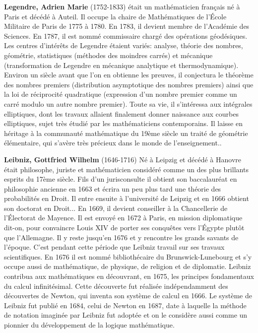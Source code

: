 \textbf{Legendre, Adrien Marie} (1752-1833) était un mathématicien français né à Paris et décédé à Auteil. Il occupe la chaire de Mathématiques de l'École Militaire de Paris de 1775 à 1780. En 1783, il devient membre de l'Académie des Sciences. En 1787, il est nommé commissaire chargé des opérations géodésiques. Les centres d'intérêts de Legendre étaient variés: analyse, théorie des nombres, géométrie, statistiques (méthodes des moindres carrés) et mécanique (transformation de Legendre en mécanique analytique et thermodynamique). Environ un siècle avant que l'on en obtienne les preuves, il conjectura le théorème des nombres premiers (distribution asymptotique des nombres premiers) ainsi que la loi de réciprocité quadratique (expression d'un nombre premier comme un carré modulo un autre nombre premier). Toute sa vie, il s'intéressa aux intégrales elliptiques, dont les travaux allaient finalement donner naissance aux courbes elliptiques, sujet très étudié par les mathématiciens contemporains. Il laisse en héritage à la communauté mathématique du 19ème siècle un traité de géométrie élémentaire, qui s'avère très précieux dans le monde de l'enseignement..

\textbf{Leibniz, Gottfried Wilhelm} (1646-1716) Né à Leipzig et décédé à Hanovre était philosophe, juriste et mathématicien considéré comme un des plus brillants esprits du 17ème siècle. Fils d'un jurisconsulte il obtient son baccalauréat en philosophie ancienne en 1663 et écrira un peu plus tard une théorie des probabilités en Droit. Il entre ensuite à l'université de Leipzig et en 1666 obtient son doctorat en Droit... En 1669, il devient conseiller à la Chancellerie de l'Électorat de Mayence. Il est envoyé en 1672 à Paris, en mission diplomatique dit-on, pour convaincre Louis XIV de porter ses conquêtes vers l'Égypte plutôt que l'Allemagne. Il y reste jusqu'en 1676 et y rencontre les grands savants de l'époque. C'est pendant cette période que Leibniz travail sur ses travaux scientifiques. En 1676 il est nommé bibliothécaire du Brunswick-Lunebourg et s'y occupe aussi de mathématique, de physique, de religion et de diplomatie. Leibniz contribua aux mathématiques en découvrant, en 1675, les principes fondamentaux du calcul infinitésimal. Cette découverte fut réalisée indépendamment des découvertes de Newton, qui inventa son système de calcul en 1666. Le système de Leibniz fut publié en 1684, celui de Newton en 1687, date à laquelle la méthode de notation imaginée par Leibniz fut adoptée et on le considère aussi comme un pionnier du développement de la logique mathématique.

